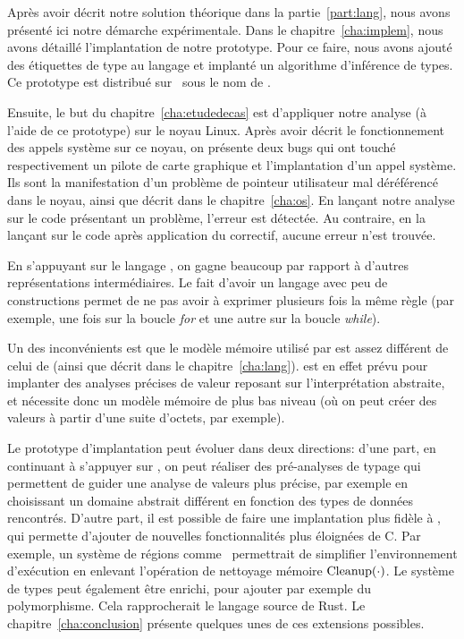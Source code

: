 Après avoir décrit notre solution théorique dans la partie~\ref{part:lang}, nous
avons présenté ici notre démarche expérimentale. Dans le
chapitre~\ref{cha:implem}, nous avons détaillé l'implantation de notre
prototype. Pour ce faire, nous avons ajouté des étiquettes de type au langage
\newspeak et implanté un algorithme d'inférence de types. Ce prototype est
distribué sur~ sous le nom de \ptrtype.

Ensuite, le but du chapitre~\ref{cha:etudedecas} est d'appliquer notre analyse
(à l'aide de ce prototype) sur le noyau Linux. Après avoir décrit le
fonctionnement des appels système sur ce noyau, on présente deux bugs qui ont
touché respectivement un pilote de carte graphique et l'implantation d'un appel
système. Ils sont la manifestation d'un problème de pointeur utilisateur mal
déréférencé dans le noyau, ainsi que décrit dans le chapitre~\ref{cha:os}. En
lançant notre analyse sur le code présentant un problème, l'erreur est détectée.
Au contraire, en la lançant sur le code après application du correctif, aucune
erreur n'est trouvée.

En s'appuyant sur le langage \newspeak, on gagne beaucoup par rapport à d'autres
représentations intermédiaires. Le fait d'avoir un langage avec peu de
constructions permet de ne pas avoir à exprimer plusieurs fois la même règle
(par exemple, une fois sur la boucle \emph{for} et une autre sur la boucle
\emph{while}).

\label{page:ccl-npk-spk}

Un des inconvénients est que le modèle mémoire utilisé par \newspeak est assez
différent de celui de \langname (ainsi que décrit dans le
chapitre~\ref{cha:lang}). \newspeak est en effet prévu pour implanter des
analyses précises de valeur reposant sur l'interprétation abstraite, et
nécessite donc un modèle mémoire de plus bas niveau (où on peut créer des
valeurs à partir d'une suite d'octets, par exemple).

Le prototype d'implantation peut évoluer dans deux directions: d'une part, en
continuant à s'appuyer sur \newspeak, on peut réaliser des pré-analyses de
typage qui permettent de guider une analyse de valeurs plus précise, par exemple
en choisissant un domaine abstrait différent en fonction des types de données
rencontrés. D'autre part, il est possible de faire une implantation plus fidèle
à \langname, qui permette d'ajouter de nouvelles fonctionnalités plus éloignées
de C. Par exemple, un système de régions comme~\cite{jfp92} permettrait de
simplifier l'environnement d'exécution en enlevant l'opération de nettoyage
mémoire $\mathrm{Cleanup}(\cdot)$. Le système de types peut également être enrichi, pour
ajouter par exemple du polymorphisme. Cela rapprocherait le langage source de
Rust. Le chapitre~\ref{cha:conclusion} présente quelques unes de ces extensions
possibles.

